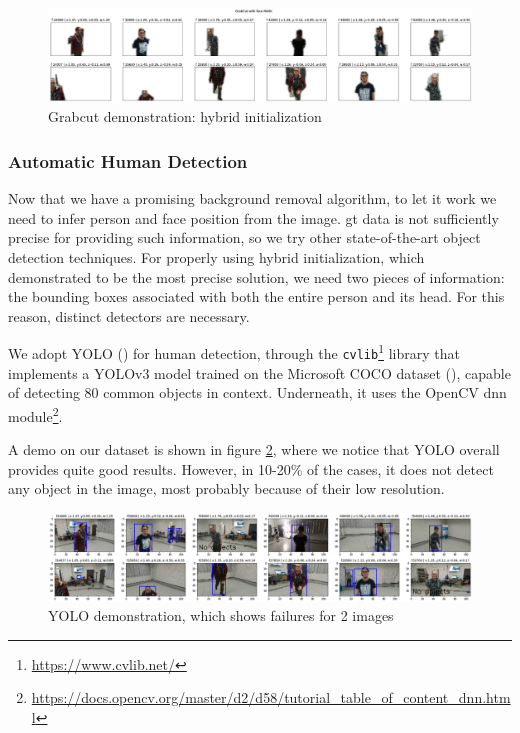 \begin{figure}[!h]
	\centering
	\includegraphics[width=1\textwidth]{"contents/images/04-2grabcut-3hybrid-final"}
	\caption[Grabcut demonstration: hybrid initialization]{Grabcut demonstration: hybrid initialization}
	\label{fig:grabcut-hybrid-example}
\end{figure}


\subsubsection{Automatic Human Detection}
\label{subsec:masking-yolo}

Now that we have a promising background removal algorithm, to let it work we need to infer person and face position from the image. \gls{gt} data is not sufficiently precise for providing such information, so we try other state-of-the-art object detection techniques. For properly using hybrid initialization, which demonstrated to be the most precise solution, we need two pieces of information: the bounding boxes associated with both the entire person and its head. For this reason, distinct detectors are necessary.

\medskip

We adopt YOLO (\cite{redmon2016look}) for human detection, through the \texttt{cvlib}\footnote{\url{https://www.cvlib.net/}} library that implements a YOLOv3 model trained on the Microsoft COCO dataset (\cite{lin2015microsoft}), capable of detecting 80 common objects in context. Underneath, it uses the OpenCV dnn module\footnote{\url{https://docs.opencv.org/master/d2/d58/tutorial_table_of_content_dnn.html}}.

A demo on our dataset is shown in figure \ref{fig:yolo}, where we notice that YOLO overall provides quite good results. However, in 10-20\% of the cases, it does not detect any object in the image, most probably because of their low resolution.

\begin{figure}[!h]
	\centering
	\includegraphics[width=1\textwidth]{"contents/images/04-3yolo"}
	\caption[YOLO demonstration, which shows failures for 2 images]{YOLO demonstration, which shows failures for 2 images}
	\label{fig:yolo}
\end{figure}


